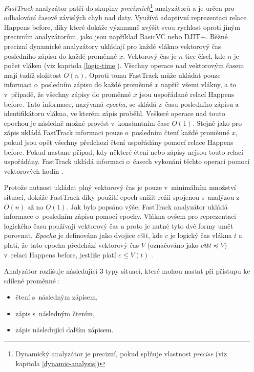 \textit{FastTrack} \cite{cite:ft} analyzátor patří do skupiny \textit{precizních}\footnote{Dynamický analyzátor je precizní, pokud splňuje vlastnost \textit{precise} (viz kapitola \ref{dynamic-analysis})} analyzátorů a je určen pro odhalování časově závislých chyb nad daty. Využívá adaptivní reprezentaci relace Happens before, díky které dokáže významně zvýšit svou rychlost oproti jiným precizním analyzátorům, jako jsou například BasicVC nebo DJIT+. Běžné precizní dynamické analyzátory ukládají pro každé vlákno vektorový čas posledního zápisu do každé proměnné $x$. Vektorový čas je $n$-tice čísel, kde $n$ je počet vláken (viz kapitola \ref{logic-time}). Všechny operace nad vektorovým časem mají tudíž složitost $O(n)$. Oproti tomu FastTrack může ukládat pouze informaci o~posledním zápisu do každé proměnné $x$ napříč všemi vlákny, a to v~případě, že všechny zápisy do proměnné $x$ jsou uspořádané relací Happens before. Tato informace, nazývaná \textit{epocha}, se skládá z~času posledního zápisu a identifikátoru vlákna, ve kterém zápis proběhl. Veškeré operace nad touto epochou je následně možné provést v~konstantním čase $O(1)$. Stejně jako pro zápis ukládá FastTrack informaci pouze o~posledním čtení každé proměnné $x$, pokud jsou opět všechny předchozí čtení uspořádány pomocí relace Happens before. Pokud nastane případ, kdy některé čtení nebo zápisy nejsou touto relací uspořádány, FastTrack ukládá informaci o~časech vykonání těchto operací pomocí vektorových hodin \cite{cite:ft}.

Protože nutnost ukládat plný vektorový čas je pouze v~minimálním množství situací, dokáže FastTrack díky použití epoch snížit režii spojenou s~analýzou z~$O(n)$ až na $O(1)$. Jak bylo popsáno výše, FastTrack analyzátor ukládá informace o~posledním zápisu pomocí epochy. Vlákna ovšem pro reprezentaci logického času používají vektorový čas a proto je nutné tyto dvě formy umět porovnat. \textit{Epocha} je definována jako dvojice $c@t$, kde $c$ je logický čas vlákna $t$ a platí, že tato epocha předchází vektorový čas $V$ (označováno jako $c@t \preceq V$) v~relaci Happens before, jestliže platí $c\leq V(t)$ \cite{cite:ft}. 

Analyzátor rozlišuje následující 3 typy situací, které mohou nastat při přístupu ke sdílené proměnné \cite{cite:ft}:
\begin{itemize}
\item čtení s~následným zápisem,
\item zápis s~následným čtením,
\item zápis následující dalším zápisem.
\end{itemize}

